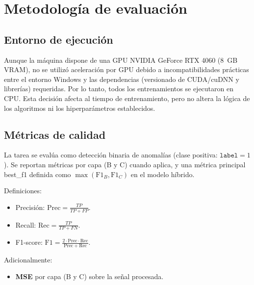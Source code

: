 \section{Metodología de evaluación}

\subsection{Entorno de ejecución} \label{subsec:entorno}
 Aunque la máquina dispone de una GPU NVIDIA GeForce RTX 4060 (8~GB VRAM), no se utilizó aceleración por GPU debido a incompatibilidades prácticas entre el entorno Windows y las dependencias (versionado de CUDA/cuDNN y librerías) requeridas. Por lo tanto, todos los entrenamientos se ejecutaron en CPU. Esta decisión afecta al tiempo de entrenamiento, pero no altera la lógica de los algoritmos ni los hiperparámetros establecidos.

\subsection{Métricas de calidad}
La tarea se evalúa como detección binaria de anomalías (clase positiva: \(\texttt{label} = 1\)). Se reportan métricas por capa (B y C) cuando aplica, y una métrica principal best\_f1 definida como \(\max(\text{F1}_B, \text{F1}_C)\) en el modelo híbrido.

Definiciones:
\begin{itemize}
    \item Precisión: \(\mathrm{Prec} = \frac{TP}{TP + FP}\).
    \item Recall: \(\mathrm{Rec} = \frac{TP}{TP + FN}\).
    \item F1-score: \(\mathrm{F1} = \frac{2 \cdot \mathrm{Prec} \cdot \mathrm{Rec}}{\mathrm{Prec} + \mathrm{Rec}}\).
\end{itemize}

Adicionalmente:
\begin{itemize}
    \item \textbf{MSE} por capa (B y C) sobre la señal procesada.
\end{itemize}


